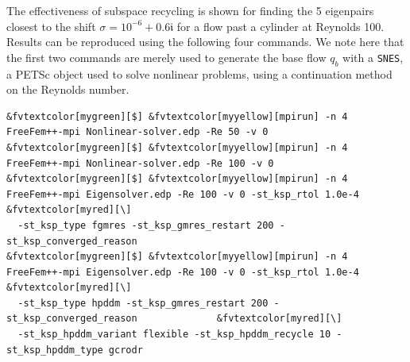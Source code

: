 \documentclass[3p,11pt]{elsarticle}
\newcommand{\pk}[1]{\texttt{#1}}
\begin{document}
The effectiveness of subspace recycling is shown for
finding the 5 eigenpairs closest to the shift $\sigma = 10^{-6} + 0.6\mathfrak{i}$ for a
flow past a cylinder at Reynolds 100. Results can be reproduced using the following four commands.
We note here that the first two commands are merely used to generate
the base flow $q_b$ with a \pk{SNES}, a PETSc object used to solve
nonlinear problems, using a continuation method on the Reynolds number. \\[-4pt]
\begin{Verbatim}[fontsize=\footnotesize,frame=single,framerule=0.1mm,commandchars=&\[\]]
&fvtextcolor[mygreen][$] &fvtextcolor[myyellow][mpirun] -n 4 FreeFem++-mpi Nonlinear-solver.edp -Re 50 -v 0
&fvtextcolor[mygreen][$] &fvtextcolor[myyellow][mpirun] -n 4 FreeFem++-mpi Nonlinear-solver.edp -Re 100 -v 0
&fvtextcolor[mygreen][$] &fvtextcolor[myyellow][mpirun] -n 4 FreeFem++-mpi Eigensolver.edp -Re 100 -v 0 -st_ksp_rtol 1.0e-4         &fvtextcolor[myred][\]
  -st_ksp_type fgmres -st_ksp_gmres_restart 200 -st_ksp_converged_reason
&fvtextcolor[mygreen][$] &fvtextcolor[myyellow][mpirun] -n 4 FreeFem++-mpi Eigensolver.edp -Re 100 -v 0 -st_ksp_rtol 1.0e-4         &fvtextcolor[myred][\]
  -st_ksp_type hpddm -st_ksp_gmres_restart 200 -st_ksp_converged_reason              &fvtextcolor[myred][\]
  -st_ksp_hpddm_variant flexible -st_ksp_hpddm_recycle 10 -st_ksp_hpddm_type gcrodr
\end{Verbatim}
\end{document}

